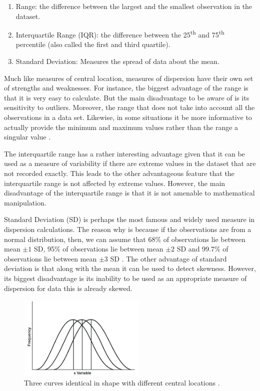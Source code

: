 \begin{enumerate}
    \item Range: the difference between the largest and the smallest observation 
    in the dataset.
    \item Interquartile Range (IQR): the difference between the 25\textsuperscript{th} and 
    75\textsuperscript{th} percentile (also called the first and third quartile).
    \item Standard Deviation: Measures the spread of data about the mean. 
\end{enumerate}

Much like measures of central location, measures of dispersion have their own set of
strengths and weaknesses. For instance, the biggest advantage of the range is that 
it is very easy to calculate. But the main disadvantage to be aware of is its 
sensitivity to outliers. Moreover, the range that does not take into account all 
the observations in a data set. Likewise, in some situations it be more informative 
to actually provide the minimum and maximum values rather than the range a singular value \cite{c1}.

The interquartile range has a rather interesting advantage given that it can be used as 
a measure of variability if there are extreme values in the dataset that are not 
recorded exactly. This leads to the other advantageous feature that the interquartile 
range is not affected by extreme values. However, the main disadvantage of the 
interquartile range is that it is not amenable to mathematical manipulation.

Standard Deviation (SD) is perhaps the most famous and widely used measure in dispersion
calculations. The reason why is because if the observations are from a normal distribution, 
then, we can assume that 68\% of observations lie between mean $\pm1$ SD, 95\% of 
observations lie between mean $\pm{2}$ SD and 99.7\% of observations lie between 
mean $\pm{3}$ SD \cite{c1}. The other advantage of standard deviation is that along with the 
mean it can be used to detect skewness. However, its biggest disadvantage is its 
inability to be used as an appropriate measure of dispersion for data this is 
already skewed.

\begin{figure}
    \centering
        \includegraphics[height=4cm]{figures/diff_central_location.png}
    \caption{Three curves identical in shape with different central locations \cite{c13}.}
    \label{figure:central_location}
\end{figure} 

